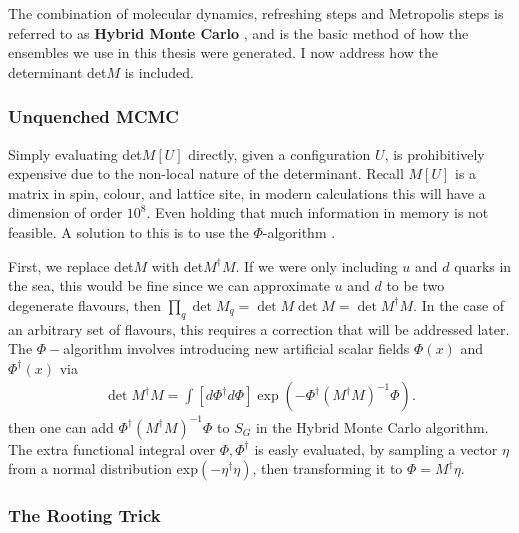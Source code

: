 The combination of molecular dynamics, refreshing steps and Metropolis steps is referred to as {\bf{Hybrid Monte Carlo}} \cite{DUANE1987216}, and is the basic method of how the ensembles we use in this thesis were generated. I now address how the determinant det$M$ is included.

\subsubsection{Unquenched MCMC}

Simply evaluating det$M[U]$ directly, given a configuration $U$, is prohibitively expensive due to the non-local nature of the determinant. Recall $M[U]$ is a matrix in spin, colour, and lattice site, in modern calculations this will have a dimension of order $10^8$. Even holding that much information in memory is not feasible. A solution to this is to use the $\Phi$-algorithm \cite{PhysRevD.35.2531}.

First, we replace det$M$ with det$M^{\dagger}M$. If we were only including $u$ and $d$ quarks in the sea, this would be fine since we can approximate $u$ and $d$ to be two degenerate flavours, then $\prod_q \det M_q = \det M \det M = \det M^{\dagger} M$. In the case of an arbitrary set of flavours, this requires a correction that will be addressed later.
The $\Phi-$algorithm involves introducing new artificial scalar fields $\Phi(x)$ and $\Phi^{\dagger}(x)$ via
\begin{align}
  \det M^{\dagger} M = \int [d\Phi^{\dagger}d\Phi] \exp(-\Phi^{\dagger} (M^{\dagger}M)^{-1}\Phi).
\end{align}
then one can add $\Phi^{\dagger} (M^{\dagger}M)^{-1}\Phi$ to $S_G$ in the Hybrid Monte Carlo algorithm. The extra functional integral over $\Phi,\Phi^{\dagger}$ is easly evaluated, by sampling a vector $\eta$ from a normal distribution exp$(-\eta^{\dagger}\eta)$, then transforming it to $\Phi = M^{\dagger} \eta$.

\subsubsection{The Rooting Trick}

